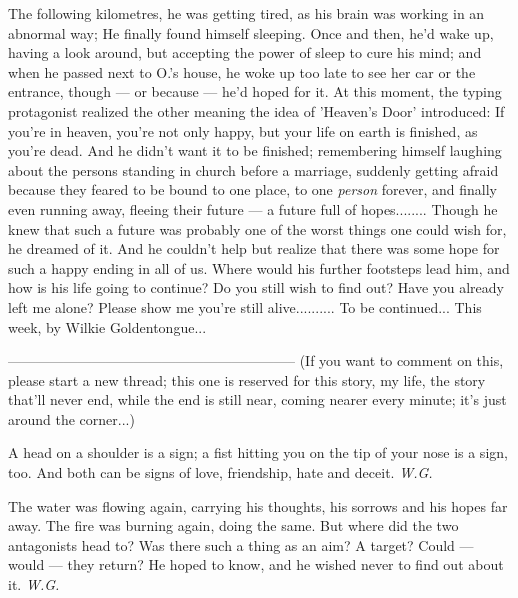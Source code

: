 The following kilometres, he was getting tired, as his brain was working in an abnormal way; He finally found himself sleeping. Once and then, he'd wake up, having a look around, but accepting the power of sleep to cure his mind; and when he passed next to O.'s house, he woke up too late to see her car or the entrance, though --- or because --- he'd hoped for it. At this moment, the typing protagonist realized the other meaning the idea of 'Heaven's Door' introduced: If you're in heaven, you're not only happy, but your life on earth is finished, as you're dead. 
And he didn't want it to be finished; remembering himself laughing about the persons standing in church before a marriage, suddenly getting afraid because they feared to be bound to one place, to one \emph{person} forever, and finally even running away, fleeing their future --- a future full of hopes........
Though he knew that such a future was probably one of the worst things one could wish for, he dreamed of it. 
And he couldn't help but realize that there was some hope for such a happy ending in all of us. 
Where would his further footsteps lead him, and how is his life going to continue?
Do you still wish to find out?
Have you already left me alone?
Please show me you're still alive..........
To be continued...
This week, by Wilkie Goldentongue...

--------------------------------------------------------------
(If you want to comment on this, please start a new thread; this one is reserved for this story, my life, the story that'll never end, while the end is still near, coming nearer every minute; it's just around the corner...)

A head on a shoulder 
is a sign; 
a fist hitting you 
on the tip of your nose 
is a sign, too. 
And both can be signs 
of love, friendship, 
hate and deceit. 
\emph{W.G.}

The water was flowing again, 
carrying his thoughts, his sorrows 
and his hopes far away. 
The fire was burning again, 
doing the same. 
But where did the two antagonists head to? 
Was there such a thing as an aim? 
A target? 
Could --- would --- they return? 
He hoped to know, and he wished never to find out about it. 
\emph{W.G.}
